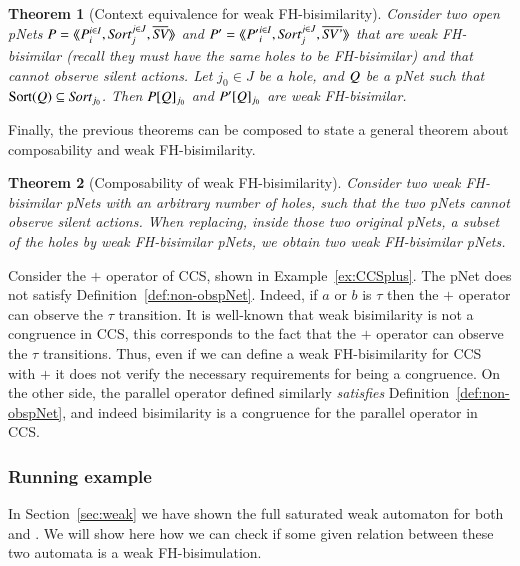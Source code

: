 \documentclass{elsarticle}
\newtheorem{thm}{Theorem}
\begin{document}
\begin{thm}[Context equivalence for  weak FH-bisimilarity]\label{weak-thm-ctxt-eq}
	Consider two  open pNets
	$\pNet = \mylangle \pNet_i^{i\in I}, \Sort_j^{j\in J}, 
	\set{\symb{SV}}\myrangle$ and 	$\pNet' = \mylangle {\pNet'}_i^{i\in I}, 
	\Sort_j^{j\in 
	J}, 	\set{\symb{SV'}}\myrangle$ that are weak FH-bisimilar
	(recall they must have the same holes to be FH-bisimilar) and that cannot observe silent actions.
	Let $j_0\in J$ be a hole, and $Q$ be a pNet such that $\Sortop(\pNetQ)\subseteq\Sort_{j_0}$. Then 
	$P[Q]_{j_0}$ and 
	$P'[Q]_{j_0}$ are weak FH-bisimilar.
\end{thm}

Finally, the previous theorems can be composed to state a general theorem about 
composability and weak FH-bisimilarity.

\begin{thm}[Composability of weak FH-bisimilarity]\label{weak-compos}
	Consider two weak FH-bisimilar pNets with an arbitrary number of holes, such that the two pNets cannot observe silent actions. When replacing, 
	inside those two original pNets, a subset of the holes by weak FH-bisimilar pNets, we 
	obtain two weak FH-bisimilar pNets.
\end{thm}

\begin{example} Consider the $+$ operator of CCS, shown in  Example~\ref{ex:CCSplus}. 
The pNet does not satisfy Definition~\ref{def:non-obspNet}. Indeed, if $a$ or $b$ is $\tau$ then the $+$ operator can  observe the $\tau$ transition.
It is well-known that weak bisimilarity is not a congruence in CCS, this corresponds to the fact that the $+$ operator can observe the $\tau$ transitions. Thus, even if we can define a weak FH-bisimilarity for CCS with $+$ it does not verify the necessary requirements for being a congruence.
On the other side, the parallel operator defined similarly \emph{satisfies} Definition~\ref{def:non-obspNet}, and indeed bisimilarity is a congruence for the parallel operator in CCS.
\end{example}

\subsubsection*{Running example}
\label{subsubsection:runnig example}
In Section~\ref{sec:weak} we have shown the full saturated weak automaton for both  and . We will show here how we can check if some given relation between these two automata is a weak FH-bisimulation. 
\end{document}
